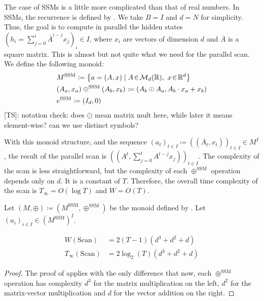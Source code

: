 \documentclass{article}
\newcommand{\TS}[1]{{\color{pink}[TS]: #1}}
\begin{document}
The case of SSMs is a little more complicated than that of real numbers. In SSMs, the recurrence is defined by . We take $B = I$ and $d = N$ for simplicity. Thus, the goal is to compute in parallel the hidden states $(h_i = \sum_{j=0}^i\overline{A}^{i-j}x_j)_i\in I$, where $x_i$ are vectors of dimension $d$ and $\overline{A}$ is a square matrix. This is almost but not quite what we need for the parallel scan. We define the following monoid:
\begin{align}
\label{eq:M_SSM}
    &M^{\mathrm{SSM}}\coloneqq \left\{a = (A, x)\mid A\!\in\!\mathcal{M}_{d}(\mathbb{R}),~x\!\in\!\mathbb{R}^d\right\}\\
\label{eq:+_SSM}
    &(A_a, x_a) \oplus^{\mathrm{SSM}} (A_b,x_b)\coloneqq (A_b \odot A_a, A_b \cdot x_a + x_b)\\
\label{eq:0_SSM}
    &e^{\mathrm{SSM}}\coloneqq(I_d, 0)
\end{align}
\TS{notation check: does $\odot$ mean matrix mult here, while later it means element-wise? can we use distinct symbols?}

With this monoid structure, and the sequence $(a_t)_{t\in I} \coloneqq ((\overline{A}_t, x_t))_{t\in I} \in M^I$, the result of the parallel scan is $((A^t, \sum_{j=0}^tA^{t-j}x_j))_{t\in I}$. The complexity of the scan is less straightforward, but the complexity of each $\oplus^{\mathrm{SSM}}$ operation depends only on $d$. It is a constant of $T$. Therefore, the overall time complexity of the scan is $T_\infty= O(\log T)$ and $W=O(T)$.

\begin{proposition}
    Let $(M, \oplus) \coloneqq (M^{\mathrm{SSM}}, \oplus^{\mathrm{SSM}})$ be the monoid defined by . Let $(a_i)_{i\in I}\in (M^{\mathrm{SSM}})^I$.

\begin{align}
    W(\mathrm{Scan})&= 2(T-1)(d^3+d^2+d)\\
    T_\infty(\mathrm{Scan})&= 2\log_2 (T) (d^3+d^2+d)
\end{align}
\end{proposition}

\begin{proof}
The proof of  applies with the only difference that now, each $\oplus^{\mathrm{SSM}}$ operation has complexity $d^3$ for the matrix multiplication on the left, $d^2$ for the matrix-vector multiplication and $d$ for the vector addition on the right.
\end{proof}
\end{document}
